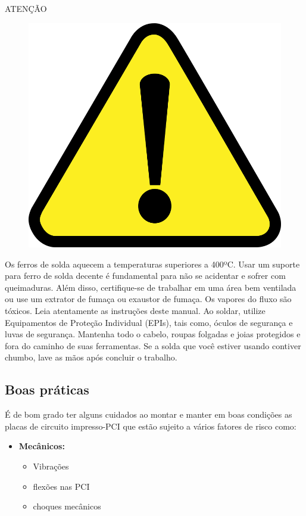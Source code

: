 \begin{center}
ATENÇÃO
\begin{figure}[H]
 \centering
 \includegraphics[scale = 0.1]{Figuras/atenção.png}
\end{figure}
\end{center}

\par Os ferros de solda aquecem a temperaturas superiores a 400ºC. Usar um suporte para ferro de solda decente é fundamental para não se acidentar e sofrer com queimaduras. Além disso, certifique-se de trabalhar em uma área bem ventilada ou use um extrator de fumaça ou exaustor de fumaça. Os vapores do fluxo são tóxicos. Leia atentamente as instruções deste manual. Ao soldar, utilize Equipamentos de Proteção Individual (EPIs), tais como, óculos de segurança e luvas de segurança. Mantenha todo o cabelo, roupas folgadas e joias protegidos e fora do caminho de suas ferramentas. Se a solda que você estiver usando contiver chumbo, lave as mãos após concluir o trabalho.


\subsection{Boas práticas}
\PAR É de bom grado ter alguns cuidados ao montar e manter em boas condições as placas de circuito impresso-PCI que estão sujeito a vários fatores de risco como:
\begin{itemize}
\item \textbf{Mecânicos:}
\begin{itemize}
\item Vibrações
\item flexões nas PCI 
\item choques mecânicos
\end{itemize}
\end{itemize}

